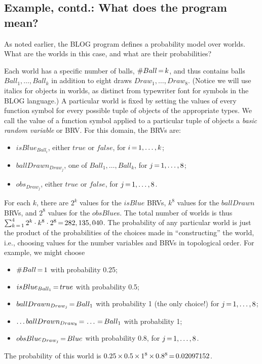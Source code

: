 \documentclass[12pt]{article}
\begin{document}
\subsection{Example, contd.: What does the program mean?}

As noted earlier, the BLOG program defines a probability model over worlds. 
What are the worlds in this case, and what are their probabilities?

Each world has a specific number of balls, $\#Ball{\,{=}\,} k$, and thus contains
balls $Ball_1,\ldots,Ball_k$ in addition to eight draws $Draw_1,\ldots,Draw_8$.
(Notice we will use italics for objects in worlds, as distinct from
typewriter font for symbols in the BLOG language.)
A particular world is fixed by setting the values of every function symbol
for every possible tuple of objects of the appropriate types. We call
the value of a function symbol applied to a particular tuple of objects
a {\em basic random variable} or BRV. For this domain, the BRVs are:
\begin{itemize}
\item $isBlue_{Ball_i}$, either $true$ or $false$, for $i{\,{=}\,}1,\ldots,k$;
\item $ballDrawn_{Draw_j}$, one of $Ball_1,\ldots,Ball_k$,  for $j{\,{=}\,}1,\ldots,8$;
\item $obs_{Draw_j}$, either $true$ or $false$,  for $j{\,{=}\,}1,\ldots,8$.
\end{itemize}
For each $k$, there are $2^k$ values for the $isBlue$ BRVs,
$k^8$ values for the $ballDrawn$ BRVs, and $2^8$ values for
the $obsBlue$s. The total number of worlds is thus
$\sum_{k{\,{=}\,} 1}^4 2^k \cdot k^8 \cdot 2^8 {\,{=}\,} 282,135,040$.
The probability of any particular world is just the product of the probabilities 
of the choices made in ``constructing'' the world, i.e., choosing values
for the number variables and BRVs in topological order. For example, we might choose
\begin{itemize}
\item $\#Ball{\,{=}\,} 1$ with probability 0.25;
\item $isBlue_{Ball_1}{\,{=}\,} true$ with probability 0.5;
\item $ballDrawn_{Draw_j}{\,{=}\,} Ball_1$ with probability 1 (the only choice!) for $j{\,{=}\,}1,\ldots,8$;
\item $\ldots ballDrawn_{Draw_8}{\,{=}\,} \ldots {\,{=}\,} Ball_1$ with probability 1;
\item $obsBlue_{Draw_j}{\,{=}\,} Blue$ with probability 0.8, for $j{\,{=}\,}1,\ldots,8$.
\end{itemize}
The probability of this world is $0.25 {\,\times\,} 0.5 {\,\times\,} 1^8 {\,\times\,} 0.8^8{\,{=}\,} 0.02097152$.
\end{document}
